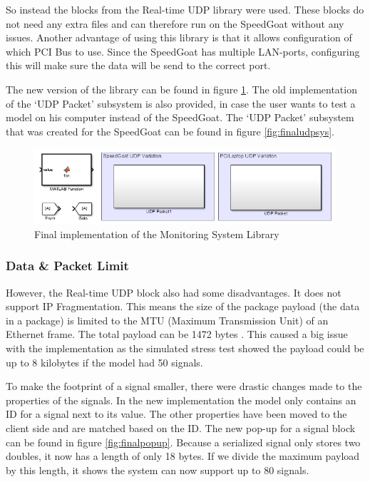 So instead the blocks from the Real-time UDP library were used. These blocks do not need any extra files and can therefore run on the SpeedGoat without any issues. Another advantage of using this library is that it allows configuration of which PCI Bus to use. Since the SpeedGoat has multiple LAN-ports, configuring this will make sure the data will be send to the correct port.

The new version of the library can be found in figure \ref{fig:finalmonsys}. The old implementation of the `UDP Packet' subsystem is also provided, in case the user wants to test a model on his computer instead of the SpeedGoat. The `UDP Packet' subsystem that was created for the SpeedGoat can be found in figure \ref{fig:finaludpsys}.

\begin{figure}[H]
	\centering
	\includegraphics[width=.9\textwidth]{implementation/libraryfinal}
	\caption{Final implementation of the Monitoring System Library} 
	\label{fig:finalmonsys}
\end{figure}

\subsubsection{Data \& Packet Limit}
However, the Real-time UDP block also had some disadvantages. It does not support IP Fragmentation. This means the size of the package payload (the data in a package) is limited to the MTU (Maximum Transmission Unit) of an Ethernet frame. The total payload can be 1472 bytes \cite{web:RealTimeUdp}. This caused a big issue with the implementation as the simulated stress test showed the payload could be up to 8 kilobytes if the model had 50 signals.

To make the footprint of a signal smaller, there were drastic changes made to the properties of the signals. In the new implementation the model only contains an ID for a signal next to its value. The other properties have been moved to the client side and are matched based on the ID. The new pop-up for a signal block can be found in figure \ref{fig:finalpopup}. Because a serialized signal only stores two doubles, it now has a length of only 18 bytes. If we divide the maximum payload by this length, it shows the system can now support up to 80 signals.

